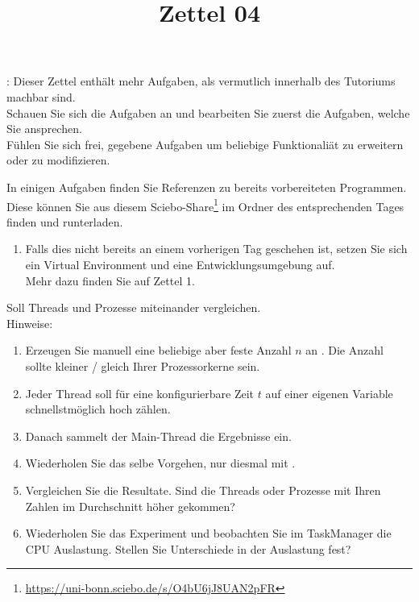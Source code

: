 \documentclass{ubo_tex_uebungszettel/uebungszettel}
\title{Zettel 04}
\theoremstyle{definition}
\newcommand{\furl}[1]{\footnote{\url{#1}}}
\begin{document}
\maketitle

\noindent {}: \quad
Dieser Zettel enthält mehr Aufgaben, als vermutlich innerhalb des Tutoriums machbar sind.\\
Schauen Sie sich die Aufgaben an und bearbeiten Sie zuerst die Aufgaben, welche Sie ansprechen.\\
Fühlen Sie sich frei, gegebene Aufgaben um beliebige Funktionaliät zu erweitern oder zu modifizieren.

\medskip

\noindent In einigen Aufgaben finden Sie Referenzen zu bereits vorbereiteten Programmen. Diese können Sie aus diesem Sciebo-Share\furl{https://uni-bonn.sciebo.de/s/O4bU6jJ8UAN2pFR} im Ordner des entsprechenden Tages finden und runterladen.

\medskip


\noindent {} \quad

    \begin{enumerate}
        \item Falls dies nicht bereits an einem vorherigen Tag geschehen ist, setzen Sie sich ein Virtual Environment und eine Entwicklungsumgebung auf.\\
        Mehr dazu finden Sie auf Zettel 1.

    \end{enumerate}

\medskip
\medskip

	\noindent {} \quad

\noindent Soll Threads und Prozesse miteinander vergleichen.\\

Hinweise:
\begin{enumerate}
	\item Erzeugen Sie manuell eine beliebige aber feste Anzahl $n$ an . Die Anzahl sollte kleiner / gleich Ihrer Prozessorkerne sein.
	
	\item Jeder Thread soll für eine konfigurierbare Zeit $t$ auf einer eigenen Variable schnellstmöglich hoch zählen.
	
	\item Danach sammelt der Main-Thread die Ergebnisse ein.
	
	\item Wiederholen Sie das selbe Vorgehen, nur diesmal mit .
	
	\item Vergleichen Sie die Resultate. Sind die Threads oder Prozesse mit Ihren Zahlen im Durchschnitt höher gekommen?
	
	\item Wiederholen Sie das Experiment und beobachten Sie im TaskManager die CPU Auslastung. Stellen Sie Unterschiede in der Auslastung fest?
	
\end{enumerate}
\end{document}
